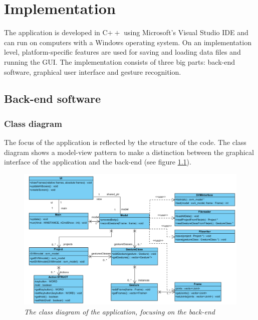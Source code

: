 \chapter{Implementation}

The application is developed in C$++$ using Microsoft's Visual Studio IDE and can run on computers with a Windows operating system. On an implementation level, platform-specific features are used for saving and loading data files and running the GUI. The implementation consists of three big parts: back-end software, graphical user interface and gesture recognition.\\


\section{Back-end software}

\subsection{Class diagram}

The focus of the application is reflected by the structure of the code. The class diagram shows a model-view pattern to make a distinction between the graphical interface of the application and the back-end (see figure \ref{fig: backend_classdiagram}).\\

\begin{figure}[H]
\begin{center}
\includegraphics[width=14cm]{ClassDiagramBackEnd.png}
\caption{\emph{The class diagram of the application, focusing on the back-end}}
\label{fig: backend_classdiagram}
\end{center}
\end{figure}

